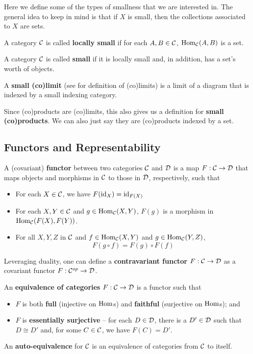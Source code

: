 \documentclass[12pt]{article}
\begin{document}
Here we define some of the types of smallness that we are interested in. The general idea to keep in mind is that if $X$ is small, then the 
collections associated to $X$ are sets.

\begin{defn}
	A category $\mathcal{C}$ is called \textbf{locally small} if for each $A,B\in\mathcal{C}$, $\operatorname{Hom}_{\mathcal{C}}(A,B)$ is a set.
\end{defn}
\begin{defn}
	A category $\mathcal{C}$ is called \textbf{small} if it is locally small and, in addition, has a set's worth of objects.
\end{defn}
\begin{defn}
	A \textbf{small (co)limit} (see \cite{riehl16} for definition of (co)limits) is a limit of a diagram that is indexed by a small indexing category.
\end{defn}
\begin{rmk}
	Since (co)products are (co)limits, this also gives us a definition for \textbf{small (co)products}. We can also just say 
	they are (co)products indexed by a set.
\end{rmk}

\subsection{Functors and Representability}
\begin{defn}
  A (covariant) \textbf{functor} between two categories $\mathcal{C}$ and $\mathcal{D}$ is a map $F:\mathcal{C}\to\mathcal{D}$ that maps objects and morphisms in $\mathcal{C}$ to those in $\mathcal{D}$, respectively, such that 
  \begin{itemize}
    \item For each $X\in\mathcal{C}$, we have $F(\operatorname{id}_X)=\operatorname{id}_{F(X)}$
    \item For each $X,Y\in\mathcal{C}$ and $g\in\operatorname{Hom}_{\mathcal{C}}(X,Y)$, $F(g)$ is a morphism in $\operatorname{Hom}_{\mathcal{C}}(F(X),F(Y))$.
    \item For all $X,Y,Z$ in $\mathcal{C}$ and $f\in\operatorname{Hom}_{\mathcal{C}}(X,Y)$ and $g\in\operatorname{Hom}_{\mathcal{C}}(Y,Z)$,
    \[F(g\circ f)=F(g)\circ F(f)\]
  \end{itemize}
\end{defn}
\begin{rmk}
	Leveraging duality, one can define a \textbf{contravariant functor} $F:\mathcal{C}\to \mathcal{D}$ as a covariant functor $F:\mathcal{C}^{op}\to \mathcal{D}$.
\end{rmk}
\begin{defn}
	An \textbf{equivalence of categories} $F:\mathcal{C}\to\mathcal{D}$ is a functor such that 
	\begin{itemize}
		\item $F$ is both \textbf{full} (injective on $\operatorname{Hom}$s) and \textbf{faithful} (surjective on $\operatorname{Hom}$s); and 
		\item $F$ is \textbf{essentially surjective} -- for each $D\in\mathcal{D}$, there is a $D'\in\mathcal{D}$ such that 
		$D\cong D'$ and, for some $C\in\mathcal{C}$, we have $F(C)=D'$.
	\end{itemize}
	An \textbf{auto-equivalence} for $\mathcal{C}$ is an equivalence of categories from $\mathcal{C}$ to itself.
\end{defn}
\end{document}
